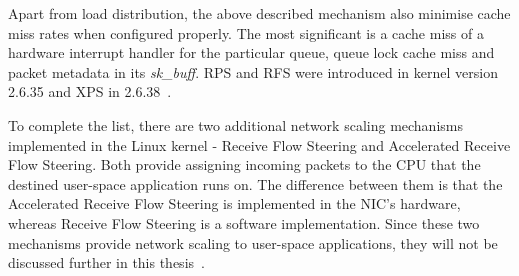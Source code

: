 Apart from load distribution, the above described mechanism also minimise cache miss rates when configured properly.
The most significant is a cache miss of a hardware interrupt handler for the particular queue,
queue lock cache miss and packet metadata in its {\it{sk\_buff}}.
RPS and RFS were introduced in kernel version 2.6.35
and XPS in 2.6.38~\cite{kernel-doc-scaling}.

To complete the list, there are two additional network scaling mechanisms implemented in the Linux kernel - 
Receive Flow Steering and Accelerated Receive Flow Steering.
Both provide assigning incoming packets to the CPU that the destined user-space application runs on.
The difference between them is that the Accelerated Receive Flow Steering is implemented in the NIC's hardware,
whereas Receive Flow Steering is a software implementation.
Since these two mechanisms provide network scaling to user-space applications, they will not be discussed further in
this thesis~\cite{kernel-doc-scaling}.
